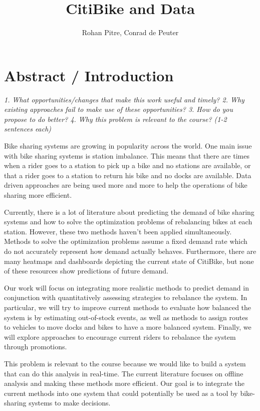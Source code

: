 \documentclass{proc}
\begin{document}
\title{CitiBike and Data}

\author{Rohan Pitre, Conrad de Peuter}

\maketitle

\section{Abstract / Introduction}

\emph{1. What opportunities/changes that make this work useful and timely?
2. Why existing approaches fail to make use of these opportunities?
3. How do you propose to do better?
4. Why this problem is relevant to the course?
(1-2 sentences each)} 

Bike sharing systems are growing in popularity across the world. One main issue with bike sharing systems is station imbalance. This means that there are times when a rider goes to a station to pick up a bike and no stations are available, or that a rider goes to a station to return his bike and no docks are available. Data driven approaches are being used more and more to help the operations of bike sharing more efficient. 

Currently, there is a lot of literature about predicting the demand of bike sharing systems and how to solve the optimization problems of rebalancing bikes at each station. However, these two methods haven't been applied simultaneously. Methods to solve the optimization problems assume a fixed demand rate which do not accurately represent how demand actually behaves. Furthermore, there are many heatmaps and dashboards depicting the current state of CitiBike, but none of these resources show predictions of future demand.

Our work will focus on integrating more realistic methods to predict demand in conjunction with quantitatively assessing strategies to rebalance the system. In particular, we will try to improve current methods to evaluate how balanced the system is by estimating out-of-stock events, as well as methods to assign routes to vehicles to move docks and bikes to have a more balanced system. Finally, we will explore approaches to encourage current riders to rebalance the system through promotions.

This problem is relevant to the course because we would like to build a system that can do this analysis in real-time. The current literature focuses on offline analysis and making these methods more efficient. Our goal is to integrate the current methods into one system that could potentially be used as a tool by bike-sharing systems to make decisions. 
\end{document}
